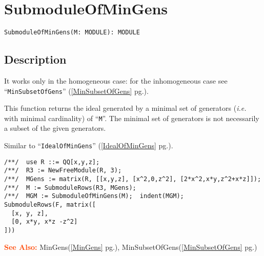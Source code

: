 \documentclass[a4paper]{mybook}
\newenvironment{command}{}{} %
\newcommand\SeeAlso{\par\textcolor{OrangeRed}{\textbf{\large See Also: }}}
\begin{document}
\section{SubmoduleOfMinGens}
\label{SubmoduleOfMinGens}
\begin{command} %


\begin{Verbatim}[label=syntax, rulecolor=\color{MidnightBlue},
frame=single]
SubmoduleOfMinGens(M: MODULE): MODULE
\end{Verbatim}


\subsection*{Description}

It works only in the homogeneous case:
for the inhomogeneous case see ``\verb&MinSubsetOfGens&'' (\ref{MinSubsetOfGens} pg.\pageref{MinSubsetOfGens}).
\par 
This function returns the ideal generated by a minimal set of generators
(\textit{i.e.} with minimal cardinality) of ``\verb&M&''.  
The minimal set of generators is not necessarily a subset of the given
generators.
\par 
Similar to ``\verb&IdealOfMinGens&'' (\ref{IdealOfMinGens} pg.\pageref{IdealOfMinGens}).
\begin{Verbatim}[label=example, rulecolor=\color{PineGreen}, frame=single]
/**/  use R ::= QQ[x,y,z];
/**/  R3 := NewFreeModule(R, 3);
/**/  MGens := matrix(R, [[x,y,z], [x^2,0,z^2], [2*x^2,x*y,z^2+x*z]]);
/**/  M := SubmoduleRows(R3, MGens);
/**/  MGM := SubmoduleOfMinGens(M);  indent(MGM);
SubmoduleRows(F, matrix([
  [x, y, z],
  [0, x*y, x*z -z^2]
]))
\end{Verbatim}


\SeeAlso %
  MinGens(\ref{MinGens} pg.\pageref{MinGens}), 
    MinSubsetOfGens(\ref{MinSubsetOfGens} pg.\pageref{MinSubsetOfGens})
\end{command} %
\end{document}
